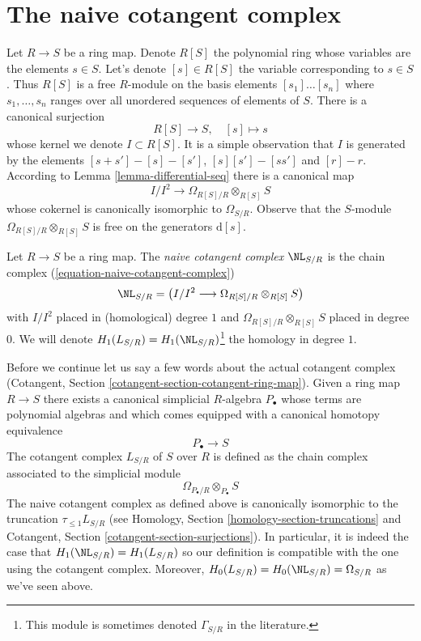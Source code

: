 \section{The naive cotangent complex}
\label{section-netherlander}

\noindent
Let $R \to S$ be a ring map. Denote $R[S]$ the polynomial ring
whose variables are the elements $s \in S$. Let's denote $[s] \in R[S]$
the variable corresponding to $s \in S$. Thus $R[S]$ is a free
$R$-module on the basis elements $[s_1] \ldots [s_n]$ where
$s_1, \ldots, s_n$ ranges over all unordered sequences of elements of $S$.
There is a canonical surjection
\begin{equation}
\label{equation-canonical-presentation}
R[S] \longrightarrow S,\quad [s] \longmapsto s
\end{equation}
whose kernel we denote $I \subset R[S]$. It is a simple observation that
$I$ is generated by the elements
$[s + s'] - [s] - [s']$, $[s][s'] - [ss']$ and $[r] - r$.
According to Lemma \ref{lemma-differential-seq}
there is a canonical map
\begin{equation}
\label{equation-naive-cotangent-complex}
I/I^2 \longrightarrow \Omega_{R[S]/R} \otimes_{R[S]} S
\end{equation}
whose cokernel is canonically isomorphic to $\Omega_{S/R}$. Observe that
the $S$-module $\Omega_{R[S]/R} \otimes_{R[S]} S$ is free on the generators
$\text{d}[s]$.

\begin{definition}
\label{definition-naive-cotangent-complex}
Let $R \to S$ be a ring map. The {\it naive cotangent complex}
$\NL_{S/R}$ is the chain complex (\ref{equation-naive-cotangent-complex})
$$
\NL_{S/R} = \left(I/I^2 \longrightarrow \Omega_{R[S]/R} \otimes_{R[S]} S\right)
$$
with $I/I^2$ placed in (homological) degree $1$ and
$\Omega_{R[S]/R} \otimes_{R[S]} S$ placed in degree $0$. We will denote
$H_1(L_{S/R}) = H_1(\NL_{S/R})$\footnote{This module is sometimes
denoted $\Gamma_{S/R}$ in the literature.} the homology in degree $1$.
\end{definition}

\noindent
Before we continue let us say a few words about the actual cotangent
complex (Cotangent, Section \ref{cotangent-section-cotangent-ring-map}).
Given a ring map $R \to S$ there exists a canonical simplicial
$R$-algebra $P_\bullet$ whose terms are polynomial algebras and
which comes equipped with a canonical homotopy equivalence
$$
P_\bullet \longrightarrow S
$$
The cotangent complex $L_{S/R}$ of $S$ over $R$ is defined as the chain
complex associated to the simplicial module
$$
\Omega_{P_\bullet/R} \otimes_{P_\bullet} S
$$
The naive cotangent complex as defined above is canonically isomorphic to
the truncation $\tau_{\leq 1}L_{S/R}$ (see
Homology, Section \ref{homology-section-truncations} and
Cotangent, Section \ref{cotangent-section-surjections}). In particular, it is
indeed the case that $H_1(\NL_{S/R}) = H_1(L_{S/R})$ so our definition is
compatible with the one using the cotangent complex. Moreover,
$H_0(L_{S/R}) = H_0(\NL_{S/R}) = \Omega_{S/R}$ as we've seen above.

